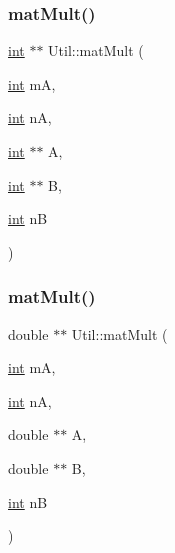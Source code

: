 \subsubsection{\texorpdfstring{mat\+Mult()}{matMult()}\hspace{0.1cm}{\footnotesize\ttfamily [1/6]}}
{\footnotesize\ttfamily \hyperlink{lp__lib_8h_adeb9ec6400320e4923ac9d836d509ddb}{int} $\ast$$\ast$ Util\+::mat\+Mult (\begin{DoxyParamCaption}\item[{\hyperlink{lp__lib_8h_adeb9ec6400320e4923ac9d836d509ddb}{int}}]{mA,  }\item[{\hyperlink{lp__lib_8h_adeb9ec6400320e4923ac9d836d509ddb}{int}}]{nA,  }\item[{\hyperlink{lp__lib_8h_adeb9ec6400320e4923ac9d836d509ddb}{int} $\ast$$\ast$}]{A,  }\item[{\hyperlink{lp__lib_8h_adeb9ec6400320e4923ac9d836d509ddb}{int} $\ast$$\ast$}]{B,  }\item[{\hyperlink{lp__lib_8h_adeb9ec6400320e4923ac9d836d509ddb}{int}}]{nB }\end{DoxyParamCaption})\hspace{0.3cm}{\ttfamily [static]}}

\mbox{\label{class_l_i_b___l_a_1_1_util_a156b88c50890c93683c002b7a0f22a88}} 
\subsubsection{\texorpdfstring{mat\+Mult()}{matMult()}\hspace{0.1cm}{\footnotesize\ttfamily [2/6]}}
{\footnotesize\ttfamily double $\ast$$\ast$ Util\+::mat\+Mult (\begin{DoxyParamCaption}\item[{\hyperlink{lp__lib_8h_adeb9ec6400320e4923ac9d836d509ddb}{int}}]{mA,  }\item[{\hyperlink{lp__lib_8h_adeb9ec6400320e4923ac9d836d509ddb}{int}}]{nA,  }\item[{double $\ast$$\ast$}]{A,  }\item[{double $\ast$$\ast$}]{B,  }\item[{\hyperlink{lp__lib_8h_adeb9ec6400320e4923ac9d836d509ddb}{int}}]{nB }\end{DoxyParamCaption})\hspace{0.3cm}{\ttfamily [static]}}


